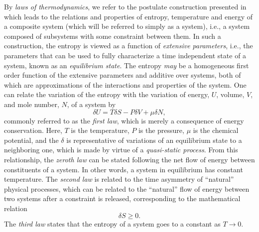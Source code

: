 \documentclass[
12pt,		%
openright,	%
twoside,  %
a4paper,			%
chapter=TITLE,		%
english,			%
french,				%
spanish,			%
brazil				%
]{USPSC-classe/USPSC}
\begin{document}
By \textit{laws of thermodynamics}, we refer to the postulate construction presented in \cite{Swendsen2020} which leads to the relations and properties of entropy, temperature and energy of a composite system (which will be referred to simply as a system), i.e., a system composed of subsystems with some constraint between them. In such a construction, the entropy is viewed as a function of \textit{extensive parameters}, i.e., the parameters that can be used to fully characterize a time independent state of a system, known as an \textit{equilibrium state}. The entropy \textit{may} be a homogeneous first order function of the extensive parameters and additive over systems, both of which are approximations of the interactions and properties of the system. One can relate the variation of the entropy with the variation of energy, $U$, volume, $V$, and mole number, $N$, of a system by 
\begin{equation}\label{firstlaw}
    \delta U=T\delta S-P\delta V+\mu\delta N,
\end{equation}
commonly referred to as the \textit{first law}, which is merely a consequence of energy conservation. Here, $T$ is the temperature, $P$ is the pressure, $\mu$ is the chemical potential, and the $\delta$ is representative of variations of an equilibrium state to a neighboring one, which is made by virtue of a \textit{quasi-static process}. From this relationship, the \textit{zeroth law} can be stated following the net flow of energy between constituents of a system. In other words, a system in equilibrium has constant temperature. The \textit{second law} is related to the time asymmetry of ``natural'' physical processes, which can be related to the ``natural'' flow of energy between two systems after a constraint is released, corresponding to the mathematical relation
\begin{equation}
    \delta S\geq0.
\end{equation}
The \textit{third law} states that the entropy of a system goes to a constant as $T\to0$. 
\end{document}
